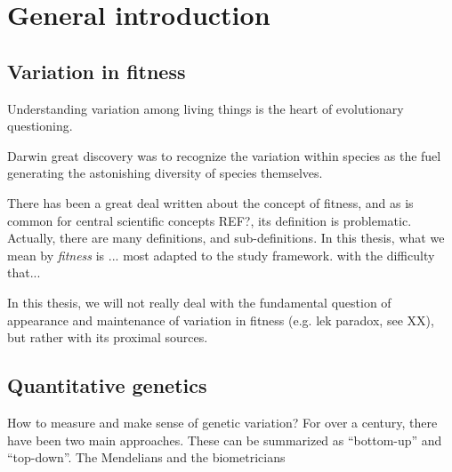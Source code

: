 
\chapter[Chapter 1: General introduction]{General introduction}

\section{Variation in fitness}
Understanding variation among living things is the heart of evolutionary questioning.


Darwin great discovery was to recognize the variation within species as the fuel generating the astonishing diversity of species themselves.

There has been a great deal written about the concept of fitness, and as is common for central scientific concepts REF?, its definition is problematic. Actually, there are many definitions, and sub-definitions. 
In this thesis, what we mean by \emph{fitness} is ...
most adapted to the study framework.
with the difficulty that... 


In this thesis, we will not really deal with the fundamental question of appearance and maintenance of variation in fitness (e.g. lek paradox, see XX), but rather with its proximal sources.

 
\section{Quantitative genetics}

How to measure and make sense of genetic variation?
For over a century, there have been two main approaches. 
These can be summarized as ``bottom-up'' and ``top-down''.
The Mendelians and the biometricians



